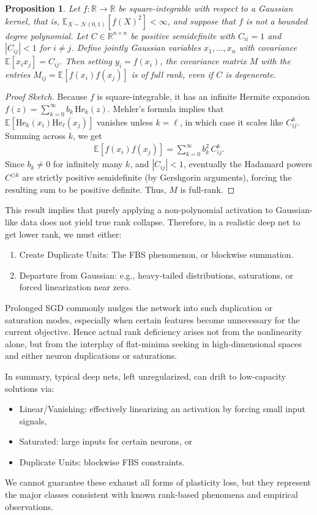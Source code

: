 \documentclass[11pt]{article}
\newcommand{\He}{\mathrm{He}}
\newtheorem{proposition}{Proposition}[section]
\begin{document}
\begin{proposition}
\label{prop:RankPreservation}
Let $ f: \mathbb{R} \to \mathbb{R}$ be square-integrable with respect to a Gaussian kernel, that is, $\mathbb{E}_{X\sim \mathcal{N}(0,1)}[f(X)^2] < \infty$, and suppose that $f$ is not a bounded degree polynomial. Let $C\in \mathbb{R}^{n\times n}$ be positive semidefinite with $C_{ii}=1$ and $|C_{ij}|<1$ for $i\neq j$. Define jointly Gaussian variables $x_1,\dots,x_n$ with covariance $\mathbb{E}[x_ix_j]=C_{ij}$. Then setting $y_i = f(x_i)$, the covariance matrix $M$ with the entries $M_{ij}=\mathbb{E}[f(x_i)f(x_j)]$ is of full rank, even if $C$ is degenerate.
\end{proposition}

\begin{proof}[Proof Sketch]
Because $f$ is square-integrable, it has an infinite Hermite expansion $f(z)=\sum_{k=0}^{\infty} b_k\, \He_k(z)$. Mehler's formula implies that $\mathbb{E}[\He_k(x_i)\He_\ell(x_j)]$ vanishes unless $k=\ell$, in which case it scales like $C_{ij}^k$. Summing across $k$, we get 
\begin{align*}
\mathbb{E}[f(x_i)f(x_j)] 
= 
\sum_{k=0}^{\infty} b_k^2\,C_{ij}^k.
\end{align*}
Since $b_k\neq 0$ for infinitely many $k$, and $|C_{ij}|<1$, eventually the Hadamard powers $C^{\odot k}$ are strictly positive semidefinite (by Gershgorin arguments), forcing the resulting sum to be positive definite. Thus, $M$ is full-rank.
\end{proof}

This result implies that purely applying a non-polynomial activation to Gaussian-like data does not yield true rank collapse. Therefore, in a realistic deep net to get lower rank, we must either:
\begin{enumerate}
    \item Create Duplicate Units: The FBS phenomenon, or blockwise summation.
    \item Departure from Gaussian: e.g., heavy-tailed distributions, saturations, or forced linearization near zero.
\end{enumerate}
Prolonged SGD commonly nudges the network into such duplication or saturation modes, especially when certain features become unnecessary for the current objective. Hence actual rank deficiency arises not from the nonlinearity alone, but from the interplay of flat-minima seeking in high-dimensional spaces and either neuron duplications or saturations.

In summary, typical deep nets, left unregularized, can drift to low-capacity solutions via:
\begin{itemize}
    \item Linear/Vanishing: effectively linearizing an activation by forcing small input signals,
    \item Saturated: large inputs for certain neurons, or
    \item Duplicate Units: blockwise FBS constraints.
\end{itemize}
We cannot guarantee these exhaust all forms of plasticity loss, but they represent the major classes consistent with known rank-based phenomena and empirical observations.
\end{document}
